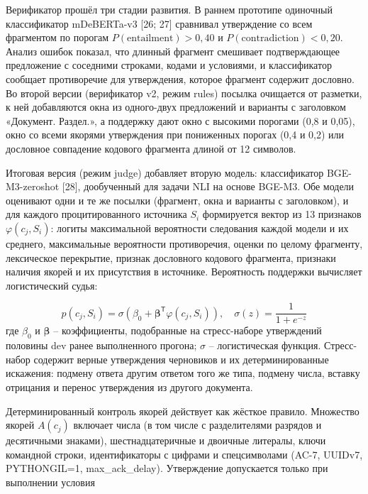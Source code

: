 \documentclass[14pt,a4paper]{extarticle}
\begin{document}
Верификатор прошёл три стадии развития. В раннем прототипе одиночный классификатор mDeBERTa-v3 [26; 27] сравнивал утверждение со всем фрагментом по порогам $P(\mathrm{entailment}) > 0{,}40$ и $P(\mathrm{contradiction}) < 0{,}20$. Анализ ошибок показал, что длинный фрагмент смешивает подтверждающее предложение с соседними строками, кодами и условиями, и классификатор сообщает противоречие для утверждения, которое фрагмент содержит дословно. Во второй версии (верификатор v2, режим rules) посылка очищается от разметки, к ней добавляются окна из одного-двух предложений и варианты с заголовком «Документ. Раздел.», а поддержку дают окно с высокими порогами (0,8 и 0,05), окно со всеми якорями утверждения при пониженных порогах (0,4 и 0,2) или дословное совпадение кодового фрагмента длиной от 12 символов.

Итоговая версия (режим judge) добавляет вторую модель: классификатор BGE-M3-zeroshot [28], дообученный для задачи NLI на основе BGE-M3. Обе модели оценивают одни и те же посылки (фрагмент, окна и варианты с заголовком), и для каждого процитированного источника $S_i$ формируется вектор из 13 признаков $\varphi(c_j, S_i)$: логиты максимальной вероятности следования каждой модели и их среднего, максимальные вероятности противоречия, оценки по целому фрагменту, лексическое перекрытие, признак дословного кодового фрагмента, признаки наличия якорей и их присутствия в источнике. Вероятность поддержки вычисляет логистический судья:

\begin{equation}
p(c_j, S_i) = \sigma\left(\beta_0 + \symbf{\beta}^{\mathsf{T}} \varphi(c_j, S_i)\right), \quad \sigma(z) = \frac{1}{1 + e^{-z}}
\tag{6}
\end{equation}
\noindent где $\beta_0$ и $\symbf{\beta}$ – коэффициенты, подобранные на стресс-наборе утверждений половины dev ранее выполненного прогона; $\sigma$ – логистическая функция. Стресс-набор содержит верные утверждения черновиков и их детерминированные искажения: подмену ответа другим ответом того же типа, подмену числа, вставку отрицания и перенос утверждения из другого документа.

Детерминированный контроль якорей действует как жёсткое правило. Множество якорей $A(c_j)$ включает числа (в том числе с разделителями разрядов и десятичными знаками), шестнадцатеричные и двоичные литералы, ключи командной строки, идентификаторы с цифрами и спецсимволами (AC-7, UUIDv7, PYTHONGIL=1, max\_ack\_delay). Утверждение допускается только при выполнении условия
\end{document}

